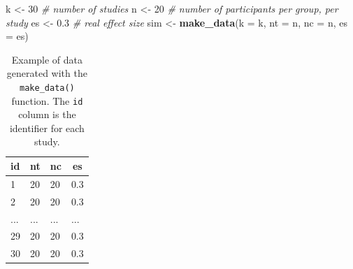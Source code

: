 \documentclass[
  man,floatsintext]{apa6}
\newenvironment{Shaded}{\begin{snugshade}}{\end{snugshade}}
\newcommand{\AttributeTok}[1]{\textcolor[rgb]{0.13,0.29,0.53}{#1}}
\newcommand{\CommentTok}[1]{\textcolor[rgb]{0.56,0.35,0.01}{\textit{#1}}}
\newcommand{\DecValTok}[1]{\textcolor[rgb]{0.00,0.00,0.81}{#1}}
\newcommand{\FloatTok}[1]{\textcolor[rgb]{0.00,0.00,0.81}{#1}}
\newcommand{\FunctionTok}[1]{\textcolor[rgb]{0.13,0.29,0.53}{\textbf{#1}}}
\newcommand{\NormalTok}[1]{#1}
\newcommand{\OtherTok}[1]{\textcolor[rgb]{0.56,0.35,0.01}{#1}}
\begin{document}
\scriptsize

\begin{Shaded}
\begin{Highlighting}[]
\NormalTok{k }\OtherTok{\textless{}{-}} \DecValTok{30} \CommentTok{\# number of studies}
\NormalTok{n }\OtherTok{\textless{}{-}} \DecValTok{20} \CommentTok{\# number of participants per group, per study}
\NormalTok{es }\OtherTok{\textless{}{-}} \FloatTok{0.3} \CommentTok{\# real effect size}
\NormalTok{sim }\OtherTok{\textless{}{-}} \FunctionTok{make\_data}\NormalTok{(}\AttributeTok{k =}\NormalTok{ k, }\AttributeTok{nt =}\NormalTok{ n, }\AttributeTok{nc =}\NormalTok{ n, }\AttributeTok{es =}\NormalTok{ es)}
\end{Highlighting}
\end{Shaded}

\normalsize

\scriptsize

\begin{table}[H]

\begin{center}
\begin{threeparttable}

\caption{\label{tab:sim-data-example-tab}Example of data generated with the \texttt{make\_data()} function. The \texttt{id} column is the identifier for each study.}

\small{

\begin{tabular}{llll}
\toprule
id & \multicolumn{1}{c}{nt} & \multicolumn{1}{c}{nc} & \multicolumn{1}{c}{es}\\
\midrule
1 & 20 & 20 & 0.3\\
2 & 20 & 20 & 0.3\\
... & ... & ... & ...\\
29 & 20 & 20 & 0.3\\
30 & 20 & 20 & 0.3\\
\bottomrule
\end{tabular}

}

\end{threeparttable}
\end{center}

\end{table}

\normalsize

\scriptsize
\end{document}
